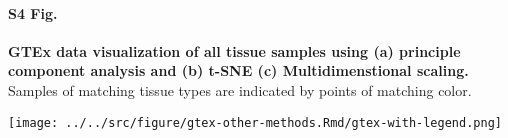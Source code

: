 \documentclass[10pt,letterpaper]{article}
\begin{document}
\paragraph*{S4 Fig.}

\label{figS4}
{\bf GTEx data visualization of all tissue samples using (a) principle component analysis and (b) t-SNE
(c) Multidimenstional scaling.}
Samples of matching tissue types are indicated by points of matching color.
\begin{figure*}[ht]
\centering
\texttt{[image: ../../src/figure/gtex-other-methods.Rmd/gtex-with-legend.png]}
\end{figure*}
\end{document}
